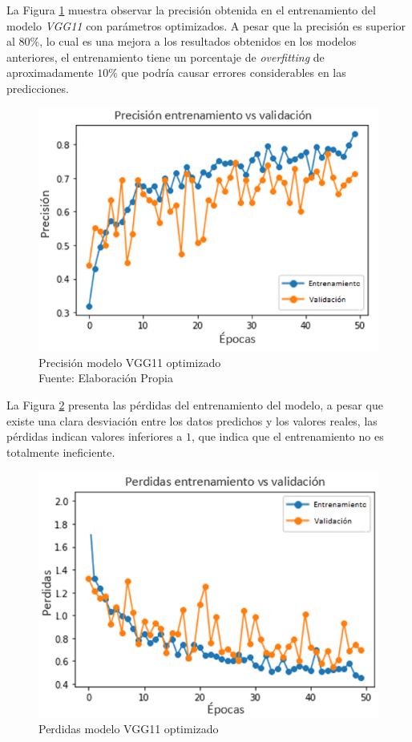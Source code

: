 La Figura \ref{fig:preci_vgg11_OPT} muestra observar la precisión obtenida en el entrenamiento del modelo \textit{VGG11} con parámetros optimizados. A pesar que la precisión es superior al $80\%$, lo cual es una mejora a los resultados obtenidos en los modelos anteriores, el entrenamiento tiene un porcentaje de \textit{overfitting} de aproximadamente $10\%$ que podría causar errores considerables en las predicciones.

\begin{figure}[ht]
	\centering
	\includegraphics[scale=0.63]{Figs/508.png}
	\caption{Precisión modelo VGG11 optimizado\\Fuente: Elaboración Propia}
	\label{fig:preci_vgg11_OPT}
\end{figure}

La Figura \ref{fig:perdda_vgg11_opt} presenta las pérdidas del entrenamiento del modelo, a pesar que existe una clara desviación entre los datos predichos y los valores reales, las pérdidas indican valores inferiores a $1$, que indica que el entrenamiento no es totalmente ineficiente.

\begin{figure}[ht]
	\centering
	\includegraphics[scale=0.63]{Figs/509.png}
	\caption{Perdidas modelo VGG11 optimizado}
	\label{fig:perdda_vgg11_opt}
\end{figure}


